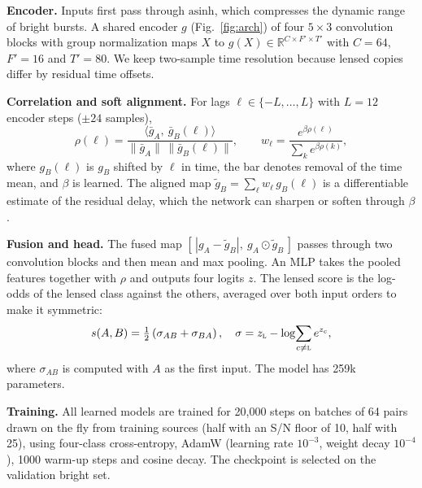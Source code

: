 \documentclass[conference]{IEEEtran}
\begin{document}
\textbf{Encoder.} Inputs first pass through $\mathrm{asinh}$, which compresses the dynamic range of bright bursts. A shared
encoder $g$ (Fig.~\ref{fig:arch}) of four $5\times3$ convolution blocks with group normalization maps $X$ to
$g(X)\in\mathbb{R}^{C\times F'\times T'}$ with $C=64$, $F'=16$ and $T'=80$. We keep two-sample time resolution because
lensed copies differ by residual time offsets.

\textbf{Correlation and soft alignment.} For lags $\ell\in\{-L,\dots,L\}$ with $L=12$ encoder steps ($\pm24$ samples),
\begin{equation}
\rho(\ell)=\frac{\langle \bar g_A,\ \bar g_B(\ell)\rangle}{\lVert \bar g_A\rVert\,\lVert \bar g_B(\ell)\rVert},\qquad
w_\ell=\frac{e^{\beta\rho(\ell)}}{\sum_{k}e^{\beta\rho(k)}},
\label{eq:corr}
\end{equation}
where $g_B(\ell)$ is $g_B$ shifted by $\ell$ in time, the bar denotes removal of the time mean, and $\beta$ is learned. The
aligned map $\tilde g_B=\sum_\ell w_\ell\, g_B(\ell)$ is a differentiable estimate of the residual delay, which the network
can sharpen or soften through $\beta$.

\textbf{Fusion and head.} The fused map $[\,|g_A-\tilde g_B|,\ g_A\odot\tilde g_B\,]$ passes through two convolution blocks
and then mean and max pooling. An MLP takes the pooled features together with $\rho$ and outputs four logits $z$. The lensed
score is the log-odds of the lensed class against the others, averaged over both input orders to make it symmetric:
\begin{equation}
s(A,B)=\tfrac12\left(\sigma_{AB}+\sigma_{BA}\right),\quad \sigma=z_{\textsc{l}}-\log\!\sum_{c\neq\textsc{l}}e^{z_c},
\label{eq:score}
\end{equation}
where $\sigma_{AB}$ is computed with $A$ as the first input. The model has 259k parameters.

\textbf{Training.} All learned models are trained for 20{,}000 steps on batches of 64 pairs drawn on the fly from training
sources (half with an S/N floor of 10, half with 25), using four-class cross-entropy, AdamW (learning rate $10^{-3}$, weight
decay $10^{-4}$), 1000 warm-up steps and cosine decay. The checkpoint is selected on the validation bright set.
\end{document}
